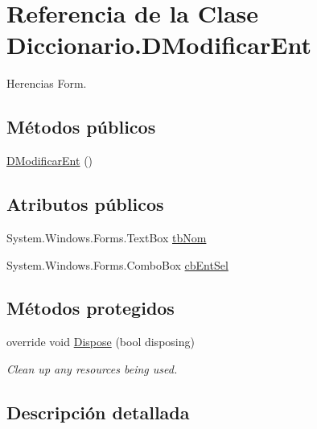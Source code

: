 \hypertarget{class_diccionario_1_1_d_modificar_ent}{\section{Referencia de la Clase Diccionario.\-D\-Modificar\-Ent}
\label{class_diccionario_1_1_d_modificar_ent}
}


Herencias Form.

\subsection*{Métodos públicos}
\begin{DoxyCompactItemize}
\item 
\hyperlink{class_diccionario_1_1_d_modificar_ent_a9808db5bce435841c5f06d50dd6e974e}{D\-Modificar\-Ent} ()
\end{DoxyCompactItemize}
\subsection*{Atributos públicos}
\begin{DoxyCompactItemize}
\item 
System.\-Windows.\-Forms.\-Text\-Box \hyperlink{class_diccionario_1_1_d_modificar_ent_a293b61cfcd687ff24d2aa5eb5254f956}{tb\-Nom}
\item 
System.\-Windows.\-Forms.\-Combo\-Box \hyperlink{class_diccionario_1_1_d_modificar_ent_ad5d89ad53a4c53b39d04e69fa3dcff49}{cb\-Ent\-Sel}
\end{DoxyCompactItemize}
\subsection*{Métodos protegidos}
\begin{DoxyCompactItemize}
\item 
override void \hyperlink{class_diccionario_1_1_d_modificar_ent_a3653af82bd56d8b4e96913dcbf2f7eec}{Dispose} (bool disposing)
\begin{DoxyCompactList}\small\item\em Clean up any resources being used. \end{DoxyCompactList}\end{DoxyCompactItemize}


\subsection{Descripción detallada}


